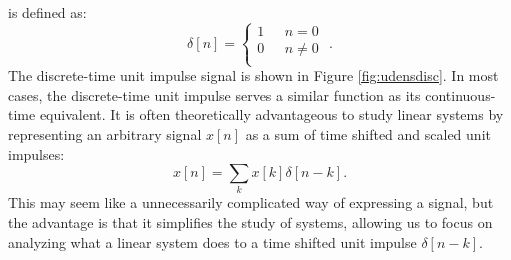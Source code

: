  is defined as:
\begin{equation}
  \delta[n] = \left\{\begin{array}{cl}
    1 & ~~~ n = 0   \\
    0 & ~~~ n \ne 0 \\
  \end{array}
  \right.\,\,.
\end{equation}
The discrete-time unit impulse signal is shown in
Figure \ref{fig:udensdisc}. In most cases, the discrete-time unit
impulse serves a similar function as its continuous-time
equivalent. It is often theoretically advantageous to study linear
systems by representing an arbitrary signal $x[n]$ as a sum of time
shifted and scaled unit impulses:
\begin{equation}
x[n] = \sum_k x[k] \delta[n-k].
\end{equation}
This may seem like a unnecessarily complicated way of expressing a
signal, but the advantage is that it simplifies the study of systems,
allowing us to focus on analyzing what a linear system does to a time
shifted unit impulse $\delta[n-k]$.



